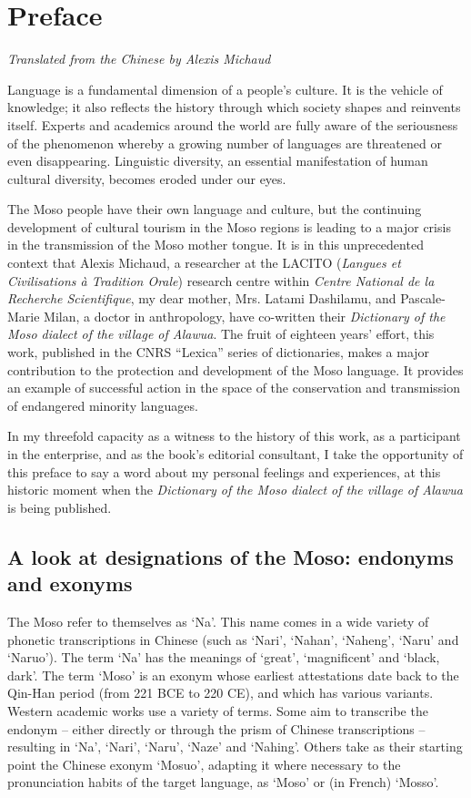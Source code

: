 \langueeng

\chapter*{Preface}

{\raggedleft \em{Translated from the Chinese by Alexis Michaud}\par}

Language is a fundamental dimension of a people's culture. It is the vehicle of knowledge; it also reflects the history through which society shapes and reinvents itself. Experts and academics around the world are fully aware of the seriousness of the phenomenon whereby a growing number of languages are threatened or even disappearing. Linguistic diversity, an essential manifestation of human cultural diversity, becomes eroded under our eyes.

The Moso people have their own language and culture, but the continuing development of cultural tourism in the Moso regions is leading to a major crisis in the transmission of the Moso mother tongue. It is in this unprecedented context that Alexis Michaud, a researcher at the LACITO (\emph{Langues et Civilisations à Tradition Orale}) research centre within \emph{Centre National de la Recherche Scientifique}, my dear mother, Mrs. Latami Dashilamu, and Pascale-Marie Milan, a doctor in anthropology, have co-written their \emph{Dictionary of the Moso dialect of the village of Alawua}. The fruit of eighteen years' effort, this work, published in the CNRS “Lexica” series of dictionaries, makes a major contribution to the protection and development of the Moso language. It provides an example of successful action in the space of the conservation and transmission of endangered minority languages.

In my threefold capacity as a witness to the history of this work, as a participant in the enterprise, and as the book's editorial consultant, I take the opportunity of this preface to say a word about my personal feelings and experiences, at this historic moment when the \emph{Dictionary of the Moso dialect of the village of Alawua} is being published.

\section*{A look at designations of the Moso: endonyms and exonyms}

The Moso refer to themselves as ‘Na’. This name comes in a wide variety of phonetic transcriptions in Chinese (such as ‘Nari’, ‘Nahan’, ‘Naheng’, ‘Naru’ and ‘Naruo’). The term ‘Na’ has the meanings of ‘great’, ‘magnificent’ and ‘black, dark’. The term ‘Moso’ is an exonym whose earliest attestations date back to the Qin-Han period (from 221 BCE to 220 CE), and which has various variants. Western academic works use a variety of terms. Some aim to transcribe the endonym -- either directly or through the prism of Chinese transcriptions -- resulting in ‘Na’, ‘Nari’, ‘Naru’, ‘Naze’ and ‘Nahing’. Others take as their starting point the Chinese exonym  ‘Mosuo’, adapting it where necessary to the pronunciation habits of the target language, as ‘Moso’ or (in French) ‘Mosso’.

